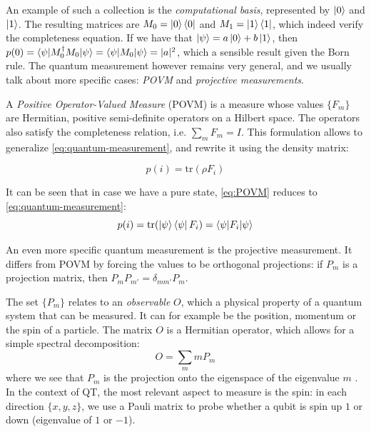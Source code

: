 \documentclass[12pt]{memoir}
\newcommand{\tr}{\text{tr}}
\begin{document}
An example of such a collection is the \textit{computational basis}, represented by $\ket 0$ and $\ket 1$. The resulting matrices are $M_0 = \ket 0 \bra 0$ and $M_1 = \ket 1 \bra 1$, which indeed verify the completeness equation. If we have that $\ket \psi = a \ket 0 + b \ket 1$, then $p(0) = \braket{\psi|M_0^\dagger M_0|\psi} = \braket{\psi|M_0|\psi} = |a|^2$, which a sensible result given the Born rule. The quantum measurement however remains very general, and we usually talk about more specific cases: \textit{POVM} and \textit{projective measurements}.\medskip
    
A \textit{Positive Operator-Valued Measure} (POVM) is a measure whose values $\{F_m\}$ are Hermitian, positive semi-definite operators on a Hilbert space. \cite{wiki:povm} The operators also satisfy the completeness relation, i.e. $\sum_m F_m = I$. This formulation allows to generalize \ref{eq:quantum-measurement}, and rewrite it using the density matrix:

\begin{equation} \label{eq:POVM}
    p(i) = \tr(\rho F_i)
\end{equation}

It can be seen that in case we have a pure state, \ref{eq:POVM} reduces to \ref{eq:quantum-measurement}:
\begin{equation}
    p(i) = \tr(\ket \psi \bra \psi F_i) = \braket{\psi|F_i|\psi}
\end{equation}

An even more specific quantum measurement is the projective measurement. It differs from POVM by forcing the values to be orthogonal projections: if $P_m$ is a projection matrix, then $P_mP_{m'}=\delta_{mm'}P_m$. \medbreak 

The set $\{P_m\}$ relates to an \textit{observable} $O$, which a physical property of a quantum system that can be measured. It can for example be the position, momentum or the spin of a particle. The matrix $O$ is a Hermitian operator, which allows for a simple spectral decomposition:
\begin{equation}
    O = \sum_m m P_m
\end{equation}
where we see that $P_m$ is the projection onto the eigenspace of the eigenvalue $m$  \cite{book:Nielsen-Chuang-2010,wiki:born-rule}. In the context of QT, the most relevant aspect to measure is the spin: in each direction $\{x,y,z\}$, we use a Pauli matrix to probe whether a qubit is spin up $1$ or down (eigenvalue of $1$ or $-1$).
\end{document}
